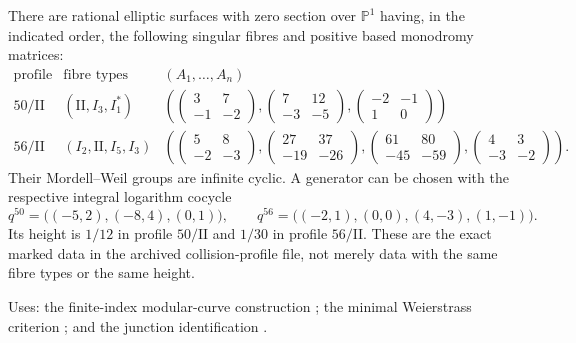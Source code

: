 \begin{theorem}
There are rational elliptic surfaces with zero section over
$\mathbb P^1$ having, in the indicated order, the following singular
fibres and positive based monodromy matrices:
\[
\begin{array}{c|c|c}
\text{profile}&\text{fibre types}&(A_1,\ldots,A_n)\\ \hline
50/\mathrm{II}&(\mathrm{II},I_3,I_1^*)&
\left(
\begin{pmatrix}3&7\\-1&-2\end{pmatrix},
\begin{pmatrix}7&12\\-3&-5\end{pmatrix},
\begin{pmatrix}-2&-1\\1&0\end{pmatrix}\right)\\[5pt]
56/\mathrm{II}&(I_2,\mathrm{II},I_5,I_3)&
\left(
\begin{pmatrix}5&8\\-2&-3\end{pmatrix},
\begin{pmatrix}27&37\\-19&-26\end{pmatrix},
\begin{pmatrix}61&80\\-45&-59\end{pmatrix},
\begin{pmatrix}4&3\\-3&-2\end{pmatrix}\right).
\end{array}
\]
Their Mordell--Weil groups are infinite cyclic.  A generator can be
chosen with the respective integral logarithm cocycle
\[
 q^{50}=\bigl((-5,2),(-8,4),(0,1)\bigr),\qquad
 q^{56}=\bigl((-2,1),(0,0),(4,-3),(1,-1)\bigr).
\]
Its height is $1/12$ in profile $50/\mathrm{II}$ and $1/30$ in
profile $56/\mathrm{II}$.  These are the exact marked data in the
archived collision-profile file, not merely data with the same fibre
types or the same height.
\end{theorem}


\noindent\textsf{Uses:} the finite-index modular-curve construction
\cite[Propositions~2.16, 2.21; Theorem~2.22; Proposition~4.3 and
Remark~4.4]{mapsMilne2017}; the minimal Weierstrass criterion
\cite[\S4.5, Table~1; \S8.2--8.4]{manSS10}; and the junction
identification \cite[\S3.1, (4), (8), (9); Lemmas~3.1--3.2, 4.1;
Corollaries~4.2--4.3]{manFukae02}.

